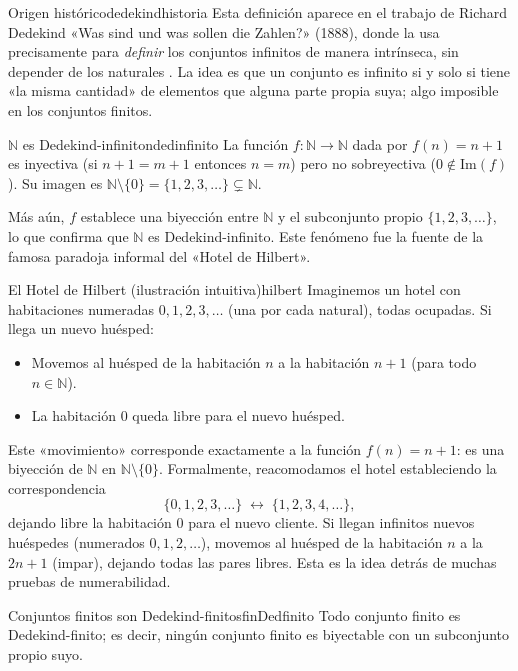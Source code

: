 \begin{observacion}{Origen histórico}{dedekindhistoria}
Esta definición aparece en el trabajo de Richard Dedekind «Was sind und was sollen die Zahlen?» (1888), donde la usa precisamente para \emph{definir} los conjuntos infinitos de manera intrínseca, sin depender de los naturales \cite{dedekind1888}. La idea es que un conjunto es infinito si y solo si tiene «la misma cantidad» de elementos que alguna parte propia suya; algo imposible en los conjuntos finitos.
\end{observacion}

\begin{ejemplo}{$\mathbb{N}$ es Dedekind-infinito}{ndedinfinito}
La función $f: \mathbb{N} \to \mathbb{N}$ dada por $f(n) = n + 1$ es inyectiva (si $n+1 = m+1$ entonces $n = m$) pero no sobreyectiva ($0 \notin \mathrm{Im}(f)$). Su imagen es $\mathbb{N} \setminus \{0\} = \{1, 2, 3, \ldots\} \subsetneq \mathbb{N}$.

Más aún, $f$ establece una biyección entre $\mathbb{N}$ y el subconjunto propio $\{1, 2, 3, \ldots\}$, lo que confirma que $\mathbb{N}$ es Dedekind-infinito. Este fenómeno fue la fuente de la famosa paradoja informal del «Hotel de Hilbert».
\end{ejemplo}

\begin{ejemplo}{El Hotel de Hilbert (ilustración intuitiva)}{hilbert}
Imaginemos un hotel con habitaciones numeradas $0, 1, 2, 3, \ldots$ (una por cada natural), todas ocupadas. Si llega un nuevo huésped:
\begin{itemize}[leftmargin=2em]
  \item Movemos al huésped de la habitación $n$ a la habitación $n+1$ (para todo $n \in \mathbb{N}$).
  \item La habitación $0$ queda libre para el nuevo huésped.
\end{itemize}
Este «movimiento» corresponde exactamente a la función $f(n) = n+1$: es una biyección de $\mathbb{N}$ en $\mathbb{N} \setminus \{0\}$. Formalmente, reacomodamos el hotel estableciendo la correspondencia
\[
  \{0,1,2,3,\ldots\} \;\longleftrightarrow\; \{1,2,3,4,\ldots\},
\]
dejando libre la habitación $0$ para el nuevo cliente. Si llegan infinitos nuevos huéspedes (numerados $0, 1, 2, \ldots$), movemos al huésped de la habitación $n$ a la $2n+1$ (impar), dejando todas las pares libres. Esta es la idea detrás de muchas pruebas de numerabilidad.
\end{ejemplo}

\begin{proposicion}{Conjuntos finitos son Dedekind-finitos}{finDedfinito}
Todo conjunto finito es Dedekind-finito; es decir, ningún conjunto finito es biyectable con un subconjunto propio suyo.
\end{proposicion}

